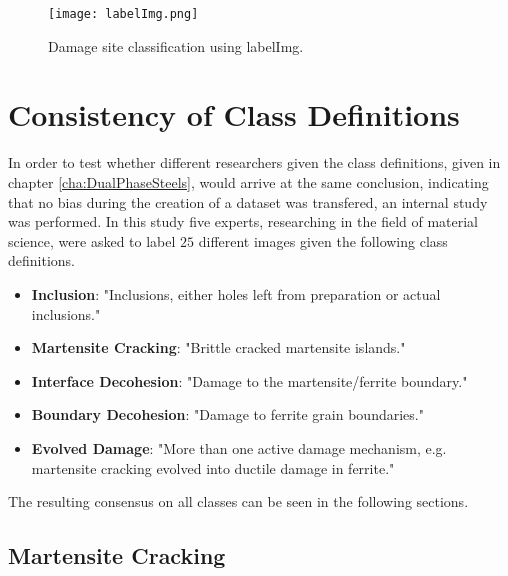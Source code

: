 \begin{figure}[H]
\centering
\texttt{[image: labelImg.png]}
\caption{Damage site classification using labelImg.}
\label{fig:labelImg}
\end{figure}


\section{Consistency of Class Definitions}

In order to test whether different researchers given the class definitions, given in chapter \ref{cha:DualPhaseSteels}, would arrive at the same conclusion, indicating that no bias during the creation of a dataset was transfered, an internal study was performed. In this study five experts, researching in the field of material science, were asked to label $25$ different images given the following class definitions.\\

\begin{itemize}[label={}]
\item \textbf{Inclusion}: "Inclusions, either holes left from preparation or actual inclusions."
\item \textbf{Martensite Cracking}: "Brittle cracked martensite islands."
\item \textbf{Interface Decohesion}: "Damage to the martensite/ferrite boundary."
\item \textbf{Boundary Decohesion}: "Damage to ferrite grain boundaries."
\item \textbf{Evolved Damage}: "More than one active damage mechanism, e.g. martensite cracking evolved into ductile damage in ferrite."
\end{itemize}

The resulting consensus on all classes can be seen in the following sections. 

\subsection{Martensite Cracking}

